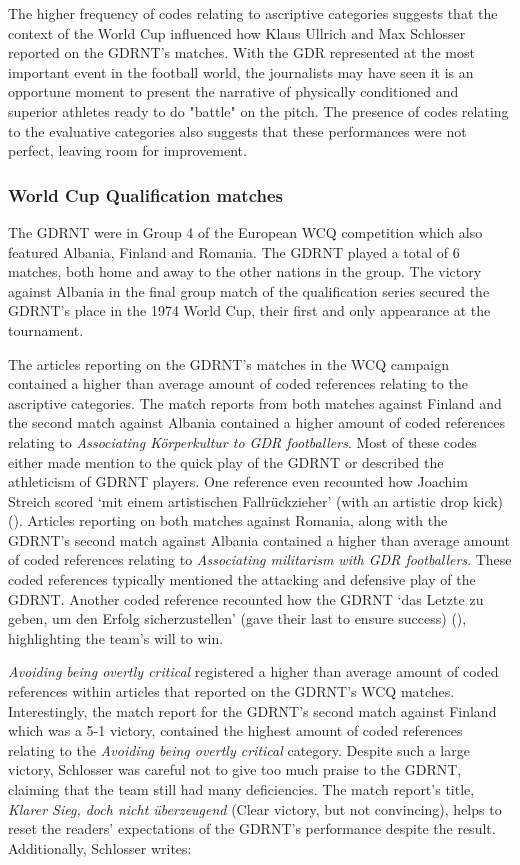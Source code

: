 The higher frequency of codes relating to ascriptive categories suggests that the context of the World Cup influenced how Klaus Ullrich and Max Schlosser reported on the GDRNT’s matches. With the GDR represented at the most important event in the football world, the journalists may have seen it is an opportune moment to present the narrative of physically conditioned and superior athletes ready to do "battle" on the pitch. The presence of codes relating to the evaluative categories also suggests that these performances were not perfect, leaving room for improvement.

\subsubsection*{World Cup Qualification matches}

The GDRNT were in Group 4 of the European WCQ competition which also featured Albania, Finland and Romania. The GDRNT played a total of 6 matches, both home and away to the other nations in the group. The victory against Albania in the final group match of the qualification series secured the GDRNT’s place in the 1974 World Cup, their first and only appearance at the tournament.

The articles reporting on the GDRNT’s matches in the WCQ campaign contained a higher than average amount of coded references relating to the ascriptive categories. The match reports from both matches against Finland and the second match against Albania contained a higher amount of coded references relating to \textit{Associating Körperkultur to GDR footballers}. Most of these codes either made mention to the quick play of the GDRNT or described the athleticism of GDRNT players. One reference even recounted how Joachim Streich scored ‘mit einem artistischen Fallrückzieher’ (with an artistic drop kick) (\cite{nd19730607}). Articles reporting on both matches against Romania, along with the GDRNT’s second match against Albania contained a higher than average amount of coded references relating to \textit{Associating militarism with GDR footballers}. These coded references typically mentioned the attacking and defensive play of the GDRNT. Another coded reference recounted how the GDRNT ‘das Letzte zu geben, um den Erfolg sicherzustellen’ (gave their last to ensure success) (\cite{nd19730927}), highlighting the team’s will to win.

\textit{Avoiding being overtly critical} registered a higher than average amount of coded references within articles that reported on the GDRNT’s WCQ matches. Interestingly, the match report for the GDRNT’s second match against Finland which was a 5-1 victory, contained the highest amount of coded references relating to the \textit{Avoiding being overtly critical} category. Despite such a large victory, Schlosser was careful not to give too much praise to the GDRNT, claiming that the team still had many deficiencies. The match report’s title, \textit{Klarer Sieg, doch nicht überzeugend} (Clear victory, but not convincing), helps to reset the readers’ expectations of the GDRNT’s performance despite the result. Additionally, Schlosser writes:

